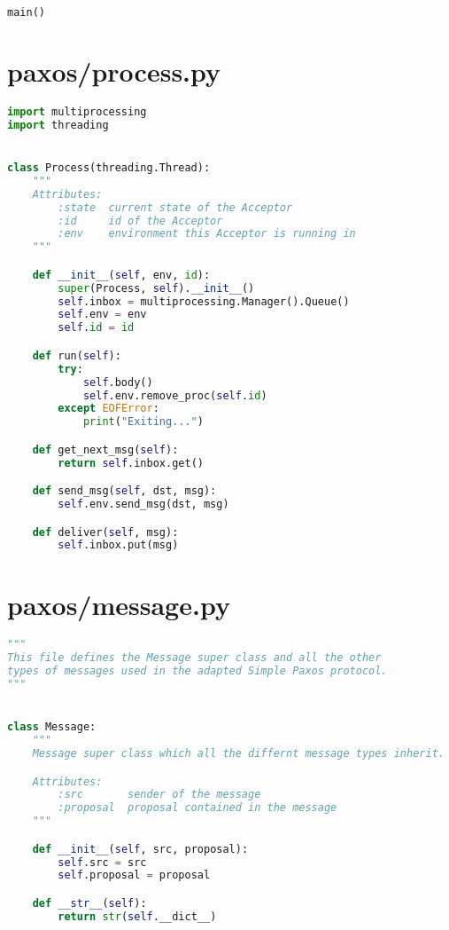 \begin{landscape}
\begin{multicols*}{2}
\begin{lstlisting}[style=SourceCodeListing,language=Python]
main()
\end{lstlisting}
\end{multicols*}

\newpage

\begin{multicols*}{2}
\section{paxos/process.py}
\begin{lstlisting}[style=SourceCodeListing,language=Python]
import multiprocessing
import threading


class Process(threading.Thread):
    """
    Attributes:
        :state  current state of the Acceptor
        :id     id of the Acceptor
        :env    environment this Acceptor is running in
    """

    def __init__(self, env, id):
        super(Process, self).__init__()
        self.inbox = multiprocessing.Manager().Queue()
        self.env = env
        self.id = id

    def run(self):
        try:
            self.body()
            self.env.remove_proc(self.id)
        except EOFError:
            print("Exiting...")

    def get_next_msg(self):
        return self.inbox.get()

    def send_msg(self, dst, msg):
        self.env.send_msg(dst, msg)

    def deliver(self, msg):
        self.inbox.put(msg)
\end{lstlisting}

\vfill

\section{paxos/message.py}
\begin{lstlisting}[style=SourceCodeListing,language=Python]
"""
This file defines the Message super class and all the other
types of messages used in the adapted Simple Paxos protocol.
"""


class Message:
    """
    Message super class which all the differnt message types inherit.

    Attributes:
        :src       sender of the message
        :proposal  proposal contained in the message
    """

    def __init__(self, src, proposal):
        self.src = src
        self.proposal = proposal

    def __str__(self):
        return str(self.__dict__)



\end{lstlisting}
\end{multicols*}
\end{landscape}
